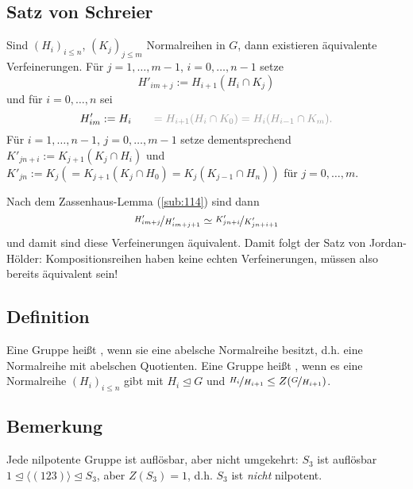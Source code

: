 
\subsection{Satz von Schreier} %
\label{sub:115}
Sind $(H_i)_{i \le n}$, $(K_j)_{j \le m}$ Normalreihen in $G$, dann existieren äquivalente Verfeinerungen.
Für $j= 1, \ldots , m-1$, $i=0, \ldots , n-1$ setze 
\[
	H'_{i m + j} := H_{i+1}( H_i \cap K_j)
\]
und  für
$i=0, \ldots ,n$ sei
\[
	H'_{i m} := H_i \qquad {\color{light_gray} =H_{i+1} (H_i \cap K_0) = H_i (H_{i-1} \cap K_m).}
\]
Für $i=1, \ldots , n-1$, $j=0, \ldots , m-1$ setze dementsprechend $K'_{j n +i} := K_{j+1}(K_j \cap H_i)$ und $K'_{j n} := K_j (= K_{j+1}(K_j \cap H_0) = K_j(K_{j-1} \cap H_n))$ für $j=0, \ldots , m$.

Nach dem Zassenhaus-Lemma (\ref{sub:114}) sind dann
\[
	\nicefrac{H'_{im +j}}{H'_{im+j+1}} \simeq \nicefrac{K'_{jn+i}}{K'_{jn + i +1}}
\]
und damit sind diese Verfeinerungen äquivalent. Damit folgt der Satz von Jordan-Hölder: Kompositionsreihen haben keine echten Verfeinerungen, müssen also bereits äquivalent 
sein!  \bewende

\subsection[Definition: Auflösbare und nilpotente Gruppen]{Definition} %
\label{sub:116}
Eine Gruppe heißt , wenn sie eine abelsche Normalreihe besitzt, d.h. eine Normalreihe mit abelschen Quotienten. Eine Gruppe heißt , wenn 
es eine Normalreihe $(H_i)_{i \le n}$ gibt mit $H_i \unlhd G$ und $\nicefrac{H_i}{H_{i+1}} \le Z \enbrace*{\nicefrac{G}{H_{i+1}}}$.

\subsection[Bemerkung: Nilpotente Gruppen sind auflösbar, Umkehrung gilt nicht]{Bemerkung} %
\label{sub:117}
Jede nilpotente Gruppe ist auflösbar, aber nicht umgekehrt: $S_3$ ist auflösbar $1 \unlhd \langle (1 2 3)\rangle \unlhd S_3$, aber $Z(S_3) = 1$, d.h. $S_3$ ist \emph{nicht}
nilpotent.

